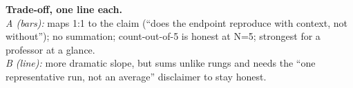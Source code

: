 \documentclass[11pt]{article}
\begin{document}
\vspace{8mm}
\noindent\textbf{Trade-off, one line each.}\\
\textit{A (bars):} maps 1:1 to the claim (``does the endpoint reproduce with
context, not without''); no summation; count-out-of-5 is honest at N=5;
strongest for a professor at a glance.\\
\textit{B (line):} more dramatic slope, but sums unlike rungs and needs the
``one representative run, not an average'' disclaimer to stay honest.
\end{document}
